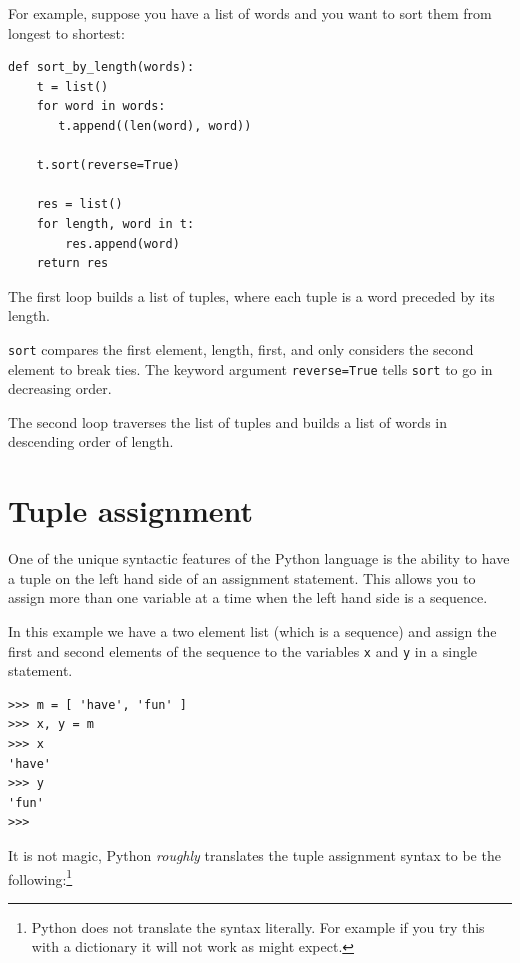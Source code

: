 \documentclass[10pt]{book}
\begin{document}
\label{DSU}

For example, suppose you have a list of words and you want to
sort them from longest to shortest:

\beforeverb
\begin{verbatim}
def sort_by_length(words):
    t = list()
    for word in words:
       t.append((len(word), word))

    t.sort(reverse=True)

    res = list()
    for length, word in t:
        res.append(word)
    return res
\end{verbatim}
\afterverb
%
The first loop builds a list of tuples, where each
tuple is a word preceded by its length.

{\tt sort} compares the first element, length, first, and
only considers the second element to break ties.  The keyword argument
{\tt reverse=True} tells {\tt sort} to go in decreasing order.


The second loop traverses the list of tuples and builds a list of
words in descending order of length.


\section{Tuple assignment}
\label{tuple assignment}


One of the unique syntactic features of the Python language
is the ability to have a tuple on the left hand
side of an assignment statement.  This allows you to assign
more than one variable at a time when the left hand side is a 
sequence.

In this example we have a two element list (which is a sequence) and
assign the first and second elements of the sequence
to the variables {\tt x} and {\tt y} in a single statement.

\beforeverb
\begin{verbatim}
>>> m = [ 'have', 'fun' ]
>>> x, y = m
>>> x
'have'
>>> y
'fun'
>>> 
\end{verbatim}
\afterverb
%
It is not magic, Python \emph{roughly} translates the 
tuple assignment syntax
to be the following:\footnote{Python does not translate the 
syntax literally.  For example if you try this with a dictionary
it will not work as might expect.}
\end{document}
